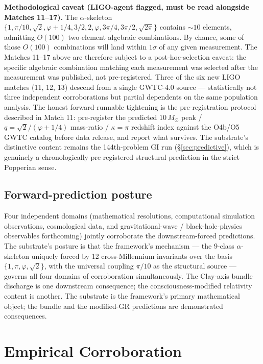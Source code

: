 \documentclass[11pt,a4paper]{amsart}
\theoremstyle{plain}
\theoremstyle{definition}
\begin{document}
\smallskip
\noindent\textbf{Methodological caveat (LIGO-agent flagged, must be read alongside Matches 11--17).} The $\alpha$-skeleton $\{1, \pi/10, \sqrt{2}, \varphi+1/4, 3/2, 2, \varphi, 3\pi/4, 3\pi/2, \sqrt{2\pi}\}$ contains $\sim 10$ elements, admitting $O(100)$ two-element algebraic combinations. By chance, some of those $O(100)$ combinations will land within $1\sigma$ of any given measurement. The Matches 11--17 above are therefore subject to a post-hoc-selection caveat: the specific algebraic combination matching each measurement was selected after the measurement was published, not pre-registered. Three of the six new LIGO matches (11, 12, 13) descend from a single GWTC-4.0 source --- statistically not three independent corroborations but partial dependents on the same population analysis. The honest forward-runnable tightening is the pre-registration protocol described in Match 11: pre-register the predicted $10\, M_\odot$ peak / $q = \sqrt{2}/(\varphi+1/4)$ mass-ratio / $\kappa = \pi$ redshift index against the O4b/O5 GWTC catalog before data release, and report what survives. The substrate's distinctive content remains the 144th-problem GI run (\S\ref{sec:predictive}), which is genuinely a chronologically-pre-registered structural prediction in the strict Popperian sense.

\subsection{Forward-prediction posture}\label{subsec:forward-posture}

Four independent domains (mathematical resolutions, computational simulation observations, cosmological data, and gravitational-wave / black-hole-physics observables forthcoming) jointly corroborate the downstream-forced predictions. The substrate's posture is that the framework's mechanism --- the 9-class $\alpha$-skeleton uniquely forced by 12 cross-Millennium invariants over the basis $\{1, \pi, \varphi, \sqrt{2}\}$, with the universal coupling $\pi/10$ as the structural source --- governs all four domains of corroboration simultaneously. The Clay-axis bundle discharge is one downstream consequence; the consciousness-modified relativity content is another. The substrate is the framework's primary mathematical object; the bundle and the modified-GR predictions are demonstrated consequences.

\section{Empirical Corroboration}\label{sec:empirical}
\end{document}
